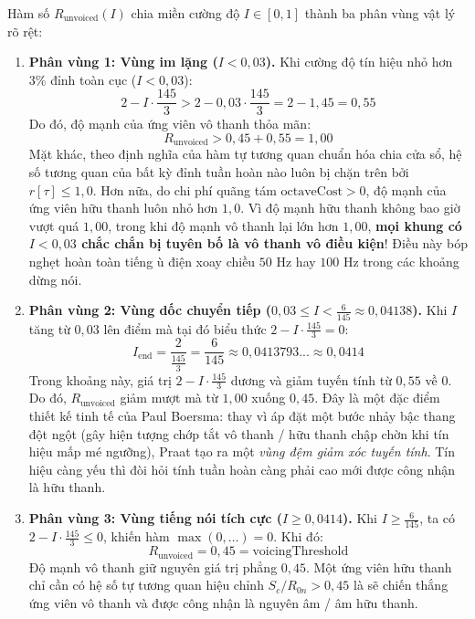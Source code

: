 Hàm số $R_{\text{unvoiced}}(I)$ chia miền cường độ $I \in [0, 1]$ thành ba phân vùng vật lý rõ rệt:
\begin{enumerate}
    \item \textbf{Phân vùng 1: Vùng im lặng ($I < 0{,}03$).}
    Khi cường độ tín hiệu nhỏ hơn $3\%$ đỉnh toàn cục ($I < 0{,}03$):
    \begin{equation}
        2 - I \cdot \frac{145}{3} > 2 - 0{,}03 \cdot \frac{145}{3} = 2 - 1{,}45 = 0{,}55
    \end{equation}
    Do đó, độ mạnh của ứng viên vô thanh thỏa mãn:
    \begin{equation}
        R_{\text{unvoiced}} > 0{,}45 + 0{,}55 = 1{,}00
    \end{equation}
    Mặt khác, theo định nghĩa của hàm tự tương quan chuẩn hóa chia cửa sổ, hệ số tương quan của bất kỳ đỉnh tuần hoàn nào luôn bị chặn trên bởi $r[\tau] \le 1{,}0$. Hơn nữa, do chi phí quãng tám $\text{octaveCost} > 0$, độ mạnh của ứng viên hữu thanh luôn nhỏ hơn $1{,}0$. Vì độ mạnh hữu thanh không bao giờ vượt quá $1{,}00$, trong khi độ mạnh vô thanh lại lớn hơn $1{,}00$, \textbf{mọi khung có $I < 0{,}03$ chắc chắn bị tuyên bố là vô thanh vô điều kiện}! Điều này bóp nghẹt hoàn toàn tiếng ù điện xoay chiều $50\text{ Hz}$ hay $100\text{ Hz}$ trong các khoảng dừng nói.

    \item \textbf{Phân vùng 2: Vùng dốc chuyển tiếp ($0{,}03 \le I < \frac{6}{145} \approx 0{,}04138$).}
    Khi $I$ tăng từ $0{,}03$ lên điểm mà tại đó biểu thức $2 - I \cdot \frac{145}{3} = 0$:
    \begin{equation}
        I_{\text{end}} = \frac{2}{\frac{145}{3}} = \frac{6}{145} \approx 0{,}0413793... \approx 0{,}0414
    \end{equation}
    Trong khoảng này, giá trị $2 - I \cdot \frac{145}{3}$ dương và giảm tuyến tính từ $0{,}55$ về $0$. Do đó, $R_{\text{unvoiced}}$ giảm mượt mà từ $1{,}00$ xuống $0{,}45$. Đây là một đặc điểm thiết kế tinh tế của Paul Boersma: thay vì áp đặt một bước nhảy bậc thang đột ngột (gây hiện tượng chớp tắt vô thanh / hữu thanh chập chờn khi tín hiệu mấp mé ngưỡng), Praat tạo ra một \emph{vùng đệm giảm xóc tuyến tính}. Tín hiệu càng yếu thì đòi hỏi tính tuần hoàn càng phải cao mới được công nhận là hữu thanh.

    \item \textbf{Phân vùng 3: Vùng tiếng nói tích cực ($I \ge 0{,}0414$).}
    Khi $I \ge \frac{6}{145}$, ta có $2 - I \cdot \frac{145}{3} \le 0$, khiến hàm $\max(0, \dots) = 0$. Khi đó:
    \begin{equation}
        R_{\text{unvoiced}} = 0{,}45 = \text{voicingThreshold}
    \end{equation}
    Độ mạnh vô thanh giữ nguyên giá trị phẳng $0{,}45$. Một ứng viên hữu thanh chỉ cần có hệ số tự tương quan hiệu chỉnh $S_c / R_{0n} > 0{,}45$ là sẽ chiến thắng ứng viên vô thanh và được công nhận là nguyên âm / âm hữu thanh.
\end{enumerate}

